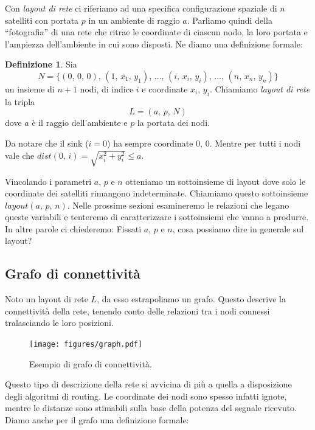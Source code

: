 \documentclass[a4paper,12pt]{article}
\theoremstyle{definition}
\newtheorem{definition}{Definizione}
\begin{document}
Con \emph{layout di rete} ci riferiamo ad una specifica configurazione spaziale di $n$ satelliti con portata $p$ in un ambiente di raggio $a$. Parliamo quindi della ``fotografia'' di una rete che ritrae le coordinate di ciascun nodo, la loro portata e l'ampiezza dell'ambiente in cui sono disposti. Ne diamo una definizione formale:

\begin{definition}
Sia
\begin{equation*}
N = \{(0,\,0,\,0),\,(1,\,x_1,\,y_1),\,\dots,\,(i,\,x_i,\,y_i),\,\dots,\,(n,\,x_n,\,y_n)\}
\end{equation*}
un insieme di $n+1$ nodi, di indice $i$ e coordinate $x_i,\,y_i$. Chiamiamo \emph{layout di rete} la tripla
\begin{equation*}
L = (a,\,p,\,N)
\end{equation*}
dove $a$ è il raggio dell'ambiente e $p$ la portata dei nodi.
\end{definition}

Da notare che il sink ($i=0$) ha sempre coordinate $0,\,0$. Mentre per tutti i nodi vale che $dist(0,\,i) = \sqrt{x_i^2+y_i^2} \leq a$.

Vincolando i parametri $a$, $p$ e $n$ otteniamo un sottoinsieme di layout dove solo le coordinate dei satelliti rimangono indeterminate. Chiamiamo questo sottoinsieme $layout(a,\,p,\,n)$. Nelle prossime sezioni esamineremo le relazioni che legano queste variabili e tenteremo di caratterizzare i sottoinsiemi che vanno a produrre. In altre parole ci chiederemo: Fissati $a$, $p$ e $n$, cosa possiamo dire in generale sul layout?

\subsection{Grafo di connettività}

Noto un layout di rete $L$, da esso estrapoliamo un grafo. Questo descrive la connettività della rete, tenendo conto delle relazioni tra i nodi connessi tralasciando le loro posizioni.

\begin{figure}[H]
\centering
\texttt{[image: figures/graph.pdf]}
\caption{Esempio di grafo di connettività.}
\end{figure}

Questo tipo di descrizione della rete si avvicina di più a quella a disposizione degli algoritmi di routing. Le coordinate dei nodi sono spesso infatti ignote, mentre le distanze sono stimabili sulla base della potenza del segnale ricevuto. Diamo anche per il grafo una definizione formale:
\end{document}
